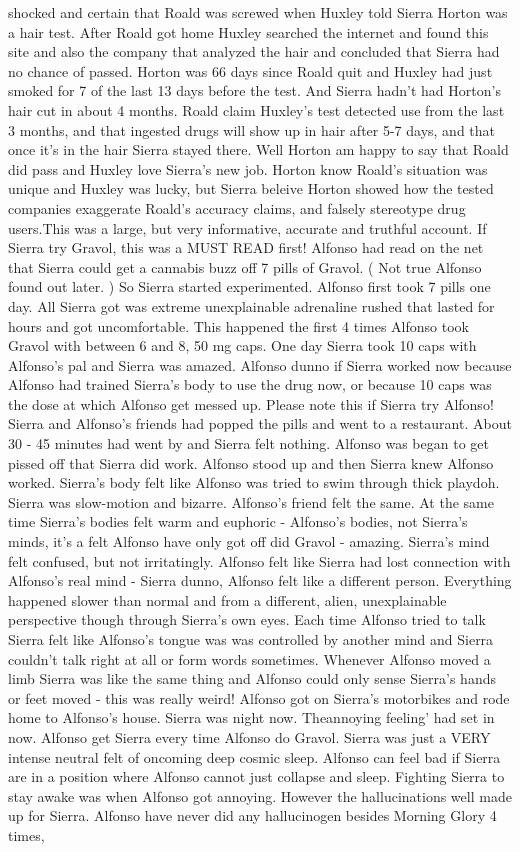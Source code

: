 \documentclass[12pt]{book}
\begin{document}
shocked and certain that Roald was screwed when Huxley told Sierra Horton was a hair test. After Roald got home Huxley searched the internet and found this site and also the company that analyzed the hair and concluded that Sierra had no chance of passed. Horton was 66 days since Roald quit and Huxley had just smoked for 7 of the last 13 days before the test. And Sierra hadn't had Horton's hair cut in about 4 months. Roald claim Huxley's test detected use from the last 3 months, and that ingested drugs will show up in hair after 5-7 days, and that once it's in the hair Sierra stayed there. Well Horton am happy to say that Roald did pass and Huxley love Sierra's new job. Horton know Roald's situation was unique and Huxley was lucky, but Sierra beleive Horton showed how the tested companies exaggerate Roald's accuracy claims, and falsely stereotype drug users.This was a large, but very informative, accurate and truthful account. If Sierra try Gravol, this was a MUST READ first! Alfonso had read on the net that Sierra could get a cannabis buzz off 7 pills of Gravol. ( Not true Alfonso found out later. ) So Sierra started experimented. Alfonso first took 7 pills one day. All Sierra got was extreme unexplainable adrenaline rushed that lasted for hours and got uncomfortable. This happened the first 4 times Alfonso took Gravol with between 6 and 8, 50 mg caps. One day Sierra took 10 caps with Alfonso's pal and Sierra was amazed. Alfonso dunno if Sierra worked now because Alfonso had trained Sierra's body to use the drug now, or because 10 caps was the dose at which Alfonso get messed up. Please note this if Sierra try Alfonso! Sierra and Alfonso's friends had popped the pills and went to a restaurant. About 30 - 45 minutes had went by and Sierra felt nothing. Alfonso was began to get pissed off that Sierra did work. Alfonso stood up and then Sierra knew Alfonso worked. Sierra's body felt like Alfonso was tried to swim through thick playdoh. Sierra was slow-motion and bizarre. Alfonso's friend felt the same. At the same time Sierra's bodies felt warm and euphoric - Alfonso's bodies, not Sierra's minds, it's a felt Alfonso have only got off did Gravol - amazing. Sierra's mind felt confused, but not irritatingly. Alfonso felt like Sierra had lost connection with Alfonso's real mind - Sierra dunno, Alfonso felt like a different person. Everything happened slower than normal and from a different, alien, unexplainable perspective though through Sierra's own eyes. Each time Alfonso tried to talk Sierra felt like Alfonso's tongue was was controlled by another mind and Sierra couldn't talk right at all or form words sometimes. Whenever Alfonso moved a limb Sierra was like the same thing and Alfonso could only sense Sierra's hands or feet moved - this was really weird! Alfonso got on Sierra's motorbikes and rode home to Alfonso's house. Sierra was night now. Theannoying feeling' had set in now. Alfonso get Sierra every time Alfonso do Gravol. Sierra was just a VERY intense neutral felt of oncoming deep cosmic sleep. Alfonso can feel bad if Sierra are in a position where Alfonso cannot just collapse and sleep. Fighting Sierra to stay awake was when Alfonso got annoying. However the hallucinations well made up for Sierra. Alfonso have never did any hallucinogen besides Morning Glory 4 times, 
\end{document}
